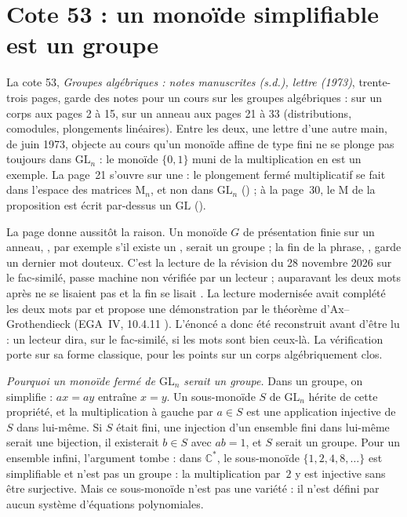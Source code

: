 \section[Cote 53 : un monoïde simplifiable est un groupe]{Cote 53 : un monoïde simplifiable est un groupe\protect{}}\label{sec:53}

La cote 53, \emph{Groupes algébriques : notes manuscrites (s.d.), lettre (1973)}, trente-trois pages, garde des notes pour un cours sur les groupes algébriques : sur un corps aux pages 2 à 15, sur un anneau aux pages 21 à 33 (distributions, comodules, plongements linéaires). Entre les deux, une lettre d'une autre main, de juin 1973, objecte au cours qu'un monoïde affine de type fini ne se plonge pas toujours dans $\mathrm{GL}_n$ : le monoïde $\{0, 1\}$ muni de la multiplication en est un exemple. La page~21 s'ouvre sur une  : le plongement fermé multiplicatif se fait dans l'espace des matrices $\mathrm M_n$, et non dans $\mathrm{GL}_n$ () ; à la page~30, le $\mathrm M$ de la proposition est écrit par-dessus un $\mathrm{GL}$ ().

La page donne aussitôt la raison. Un monoïde $G$ de présentation finie sur un anneau, , par exemple s'il existe un , serait un groupe ; la fin de la phrase, , garde un dernier mot douteux. C'est la lecture de la révision du 28 novembre 2026 sur le fac-similé, passe machine non vérifiée par un lecteur ; auparavant les deux mots après  ne se lisaient pas et la fin se lisait . La lecture modernisée avait complété les deux mots par  et propose une démonstration par le théorème d'Ax--Grothendieck (EGA~IV, 10.4.11 \cite{ega4-3}). L'énoncé a donc été reconstruit avant d'être lu : un lecteur dira, sur le fac-similé, si les mots sont bien ceux-là. La vérification porte sur sa forme classique, pour les points sur un corps algébriquement clos.

\noindent\emph{Pourquoi un monoïde fermé de $\mathrm{GL}_n$ serait un groupe.} Dans un groupe, on simplifie : $ax = ay$ entraîne $x = y$. Un sous-monoïde $S$ de $\mathrm{GL}_n$ hérite de cette propriété, et la multiplication à gauche par $a \in S$ est une application injective de $S$ dans lui-même. Si $S$ était fini, une injection d'un ensemble fini dans lui-même serait une bijection, il existerait $b \in S$ avec $ab = 1$, et $S$ serait un groupe. Pour un ensemble infini, l'argument tombe : dans $\mathbb C^*$, le sous-monoïde $\{1, 2, 4, 8, \ldots\}$ est simplifiable et n'est pas un groupe : la multiplication par~$2$ y est injective sans être surjective. Mais ce sous-monoïde n'est pas une variété : il n'est défini par aucun système d'équations polynomiales.

